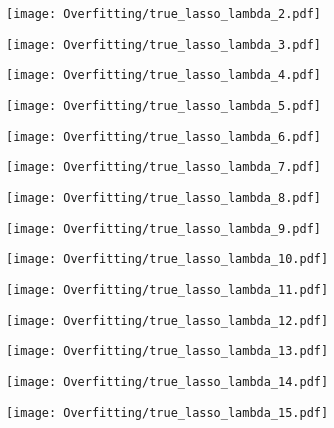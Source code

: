 \documentclass[xcolor=pdftex,dvipsnames,table]{beamer}
\begin{document}
\frame
{
	\begin{center}
		\texttt{[image: Overfitting/true\_lasso\_lambda\_2.pdf]}
	\end{center}
}
\frame
{
	\begin{center}
		\texttt{[image: Overfitting/true\_lasso\_lambda\_3.pdf]}
	\end{center}
}
\frame
{
	\begin{center}
		\texttt{[image: Overfitting/true\_lasso\_lambda\_4.pdf]}
	\end{center}
}
\frame
{
	\begin{center}
		\texttt{[image: Overfitting/true\_lasso\_lambda\_5.pdf]}
	\end{center}
}
\frame
{
	\begin{center}
		\texttt{[image: Overfitting/true\_lasso\_lambda\_6.pdf]}
	\end{center}
}
\frame
{
	\begin{center}
		\texttt{[image: Overfitting/true\_lasso\_lambda\_7.pdf]}
	\end{center}
}
\frame
{
	\begin{center}
		\texttt{[image: Overfitting/true\_lasso\_lambda\_8.pdf]}
	\end{center}
}
\frame
{
	\begin{center}
		\texttt{[image: Overfitting/true\_lasso\_lambda\_9.pdf]}
	\end{center}
}
\frame
{
	\begin{center}
		\texttt{[image: Overfitting/true\_lasso\_lambda\_10.pdf]}
	\end{center}
}
\frame
{
	\begin{center}
		\texttt{[image: Overfitting/true\_lasso\_lambda\_11.pdf]}
	\end{center}
}
\frame
{
	\begin{center}
		\texttt{[image: Overfitting/true\_lasso\_lambda\_12.pdf]}
	\end{center}
}
\frame
{
	\begin{center}
		\texttt{[image: Overfitting/true\_lasso\_lambda\_13.pdf]}
	\end{center}
}
\frame
{
	\begin{center}
		\texttt{[image: Overfitting/true\_lasso\_lambda\_14.pdf]}
	\end{center}
}
\frame
{
	\begin{center}
		\texttt{[image: Overfitting/true\_lasso\_lambda\_15.pdf]}
	\end{center}
}
\end{document}
